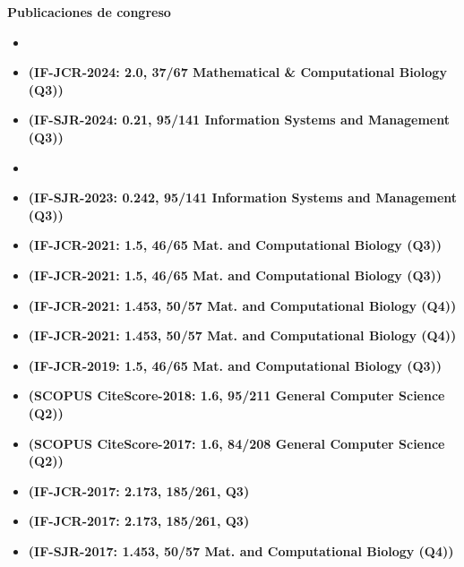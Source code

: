 \textbf{Publicaciones de congreso}
\begin{itemize}
 \item {} %
 \item {} \textbf{(IF-JCR-2024: 2.0, 37/67 Mathematical & Computational Biology (Q3))}%
 \item {} \textbf{(IF-SJR-2024: 0.21, 95/141 Information Systems and Management (Q3))} %
 \item {} 
 \item {} \textbf{(IF-SJR-2023: 0.242, 95/141 Information Systems and Management (Q3))} %
 \item {} \textbf{(IF-JCR-2021: 1.5, 46/65 Mat. and Computational Biology (Q3))} %
 \item {} \textbf{(IF-JCR-2021: 1.5, 46/65 Mat. and Computational Biology (Q3))} %
 \item {} \textbf{(IF-JCR-2021: 1.453, 50/57 Mat. and Computational Biology (Q4))}
 \item {} \textbf{(IF-JCR-2021: 1.453, 50/57 Mat. and Computational Biology (Q4))}
 \item {} \textbf{(IF-JCR-2019: 1.5, 46/65 Mat. and Computational Biology (Q3))}
 \item {} \textbf{(SCOPUS CiteScore-2018: 1.6, 95/211 General Computer Science (Q2))}
 \item {} \textbf{(SCOPUS CiteScore-2017: 1.6, 84/208 General Computer Science (Q2))}
 \item {} \textbf{(IF-JCR-2017: 2.173, 185/261, Q3)}
 \item {} \textbf{(IF-JCR-2017: 2.173, 185/261, Q3)}
 \item {} \textbf{(IF-SJR-2017: 1.453, 50/57 Mat. and Computational Biology (Q4))}
\end{itemize}


